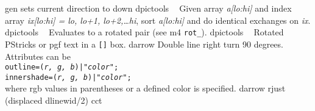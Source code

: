 %
  {gen}%
  {sets current direction to down }%
%
  {dpictools}%
  {$\;\;$ Given array {\sl a[lo:hi]} and index array {\sl ix[lo:hi] =
    lo, lo+1, lo+2,\ldots hi}, sort {\sl a[lo:hi]} and do identical exchanges
    on {\sl ix}.}%
%
  {dpictools}%
  {$\;\;$ Evaluates to a rotated pair (see m4 {\tt rot\_}).}%
%
  {dpictools}%
  {$\;\;$ Rotated PStricks or pgf text in a {\tt []} box.}%
%
  {darrow}%
  {Double line right turn 90 degrees.  Attributes can be\\
    {\tt outline=({\sl r, g, b})|"{\sl color}";}\\
    {\tt innershade=({\sl r, g, b})|"{\sl color}";}\\
    where rgb values in parentheses or a defined color is specified.}%
%
  {darrow}%
  {rjust (displaced dlinewid/2)}%
%
  {cct}%
